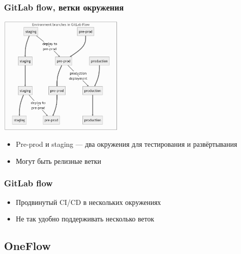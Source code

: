 \documentclass{../../slides-style}
\begin{document}
    \begin{frame}
        \frametitle{GitLab flow, ветки окружения}
        \begin{center}
            \includegraphics[width=0.45\textwidth]{gitlabFlow2.png}
        \end{center}
        \begin{itemize}
            \item Pre-prod и staging --- два окружения для тестирования и развёртывания
            \item Могут быть релизные ветки
        \end{itemize}
    \end{frame}

    \begin{frame}
        \frametitle{GitLab flow}
        \begin{itemize}
            \item Продвинутый CI/CD в нескольких окружениях
            \item Не так удобно поддерживать несколько веток
        \end{itemize}
    \end{frame}

    \subsection{OneFlow}
\end{document}

